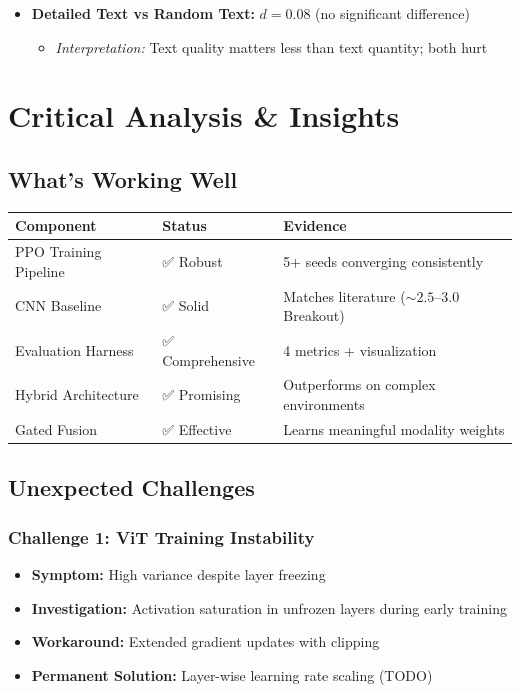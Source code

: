 \documentclass[12pt,a4paper,openany]{report}
\begin{document}
\begin{itemize}
    \item \textbf{Detailed Text vs Random Text:} $d = 0.08$ (no significant difference)
    \begin{itemize}
        \item \textit{Interpretation:} Text quality matters less than text quantity; both hurt
    \end{itemize}
\end{itemize}

\chapter{Critical Analysis \& Insights}

\section{What's Working Well}

\begin{table}[H]
\centering
\small
\begin{tabular}{lll}
\toprule
Component & Status & Evidence \\
\midrule
PPO Training Pipeline & ✅ Robust & 5+ seeds converging consistently \\
CNN Baseline & ✅ Solid & Matches literature ($\sim 2.5$--$3.0$ Breakout) \\
Evaluation Harness & ✅ Comprehensive & 4 metrics + visualization \\
Hybrid Architecture & ✅ Promising & Outperforms on complex environments \\
Gated Fusion & ✅ Effective & Learns meaningful modality weights \\
\bottomrule
\end{tabular}
\end{table}

\section{Unexpected Challenges}

\subsection{Challenge 1: ViT Training Instability}

\begin{itemize}
    \item \textbf{Symptom:} High variance despite layer freezing
    \item \textbf{Investigation:} Activation saturation in unfrozen layers during early training
    \item \textbf{Workaround:} Extended gradient updates with clipping
    \item \textbf{Permanent Solution:} Layer-wise learning rate scaling (TODO)
\end{itemize}
\end{document}
